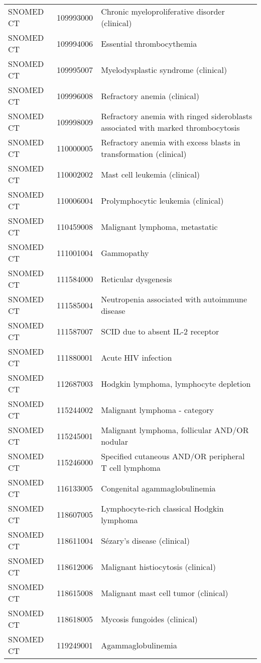 \begin{table}[ht]
\begin{tabular}{lll}
  SNOMED CT & 109993000 & Chronic myeloproliferative disorder (clinical) \\ 
  SNOMED CT & 109994006 & Essential thrombocythemia \\ 
  SNOMED CT & 109995007 & Myelodysplastic syndrome (clinical) \\ 
  SNOMED CT & 109996008 & Refractory anemia (clinical) \\ 
  SNOMED CT & 109998009 & Refractory anemia with ringed sideroblasts associated with marked thrombocytosis \\ 
  SNOMED CT & 110000005 & Refractory anemia with excess blasts in transformation (clinical) \\ 
  SNOMED CT & 110002002 & Mast cell leukemia (clinical) \\ 
  SNOMED CT & 110006004 & Prolymphocytic leukemia (clinical) \\ 
  SNOMED CT & 110459008 & Malignant lymphoma, metastatic \\ 
  SNOMED CT & 111001004 & Gammopathy \\ 
  SNOMED CT & 111584000 & Reticular dysgenesis \\ 
  SNOMED CT & 111585004 & Neutropenia associated with autoimmune disease \\ 
  SNOMED CT & 111587007 & SCID due to absent IL-2 receptor \\ 
  SNOMED CT & 111880001 & Acute HIV infection \\ 
  SNOMED CT & 112687003 & Hodgkin lymphoma, lymphocyte depletion \\ 
  SNOMED CT & 115244002 & Malignant lymphoma - category \\ 
  SNOMED CT & 115245001 & Malignant lymphoma, follicular AND/OR nodular \\ 
  SNOMED CT & 115246000 & Specified cutaneous AND/OR peripheral T cell lymphoma \\ 
  SNOMED CT & 116133005 & Congenital agammaglobulinemia \\ 
  SNOMED CT & 118607005 & Lymphocyte-rich classical Hodgkin lymphoma \\ 
  SNOMED CT & 118611004 & Sézary's disease (clinical) \\ 
  SNOMED CT & 118612006 & Malignant histiocytosis (clinical) \\ 
  SNOMED CT & 118615008 & Malignant mast cell tumor (clinical) \\ 
  SNOMED CT & 118618005 & Mycosis fungoides (clinical) \\ 
  SNOMED CT & 119249001 & Agammaglobulinemia \\ 

\end{tabular}
\end{table}
